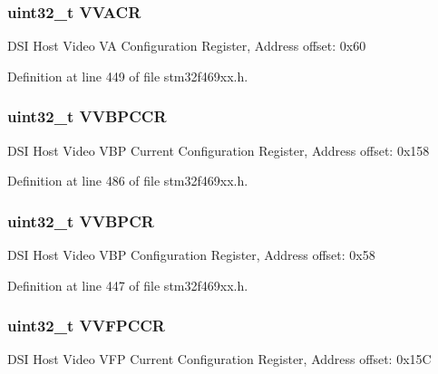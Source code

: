 \subsubsection[{\texorpdfstring{V\+V\+A\+CR}{VVACR}}]{ uint32\+\_\+t V\+V\+A\+CR}\hypertarget{struct_d_s_i___type_def_aa85636f59d822a5efe0b0b4c3ac7d5f4}{}\label{struct_d_s_i___type_def_aa85636f59d822a5efe0b0b4c3ac7d5f4}
D\+SI Host Video VA Configuration Register, Address offset\+: 0x60 

Definition at line 449 of file stm32f469xx.\+h.

\subsubsection[{\texorpdfstring{V\+V\+B\+P\+C\+CR}{VVBPCCR}}]{ uint32\+\_\+t V\+V\+B\+P\+C\+CR}\hypertarget{struct_d_s_i___type_def_aa0baa0eb0c246bbabfd63047936e1c19}{}\label{struct_d_s_i___type_def_aa0baa0eb0c246bbabfd63047936e1c19}
D\+SI Host Video V\+BP Current Configuration Register, Address offset\+: 0x158 

Definition at line 486 of file stm32f469xx.\+h.

\subsubsection[{\texorpdfstring{V\+V\+B\+P\+CR}{VVBPCR}}]{ uint32\+\_\+t V\+V\+B\+P\+CR}\hypertarget{struct_d_s_i___type_def_ade15b1e2ed1957d5c8e24adca1509169}{}\label{struct_d_s_i___type_def_ade15b1e2ed1957d5c8e24adca1509169}
D\+SI Host Video V\+BP Configuration Register, Address offset\+: 0x58 

Definition at line 447 of file stm32f469xx.\+h.

\subsubsection[{\texorpdfstring{V\+V\+F\+P\+C\+CR}{VVFPCCR}}]{ uint32\+\_\+t V\+V\+F\+P\+C\+CR}\hypertarget{struct_d_s_i___type_def_a1e1999e8c3a7bb04ff76c6b796a276de}{}\label{struct_d_s_i___type_def_a1e1999e8c3a7bb04ff76c6b796a276de}
D\+SI Host Video V\+FP Current Configuration Register, Address offset\+: 0x15C 

